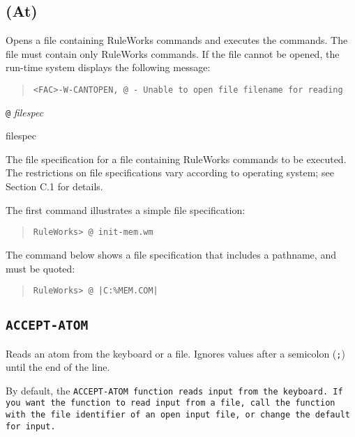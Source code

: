 \subsection{\tt@ (At)}

Opens a file containing RuleWorks commands and executes the
commands. The file must contain only RuleWorks commands. If the file
cannot be opened, the run-time system displays the following message:

\begin{quote}
\begin{verbatim}
<FAC>-W-CANTOPEN, @ - Unable to open file filename for reading
\end{verbatim}
\end{quote}

\Format

\verb|@| \it{filespec}

\begin{arguments}
\item[filespec]

  The file specification for a file containing RuleWorks commands to
  be executed. The restrictions on file specifications vary according
  to operating system; see Section C.1 for details.
\end{arguments}

\Example

The first command illustrates a simple file specification:

\begin{quote}
\begin{verbatim}
RuleWorks> @ init-mem.wm
\end{verbatim}
\end{quote}

The command below shows a file specification that includes a pathname,
and must be quoted:

\begin{quote}
\begin{verbatim}
RuleWorks> @ |C:%MEM.COM|
\end{verbatim}
\end{quote}

\subsection{\tt{ACCEPT-ATOM}}

Reads an atom from the keyboard or a file. Ignores values after a
semicolon (\verb|;|) until the end of the line.

By default, the \tt{ACCEPT-ATOM} function reads input from the
keyboard. If you want the function to read input from a file, call the
function with the file identifier of an open input file, or change the
default for input.

